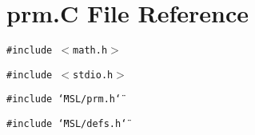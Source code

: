 \section{prm.C File Reference}
\label{prm_8C}
{\tt \#include $<$math.h$>$}\par
{\tt \#include $<$stdio.h$>$}\par
{\tt \#include \char`\"{}MSL/prm.h\char`\"{}}\par
{\tt \#include \char`\"{}MSL/defs.h\char`\"{}}\par
